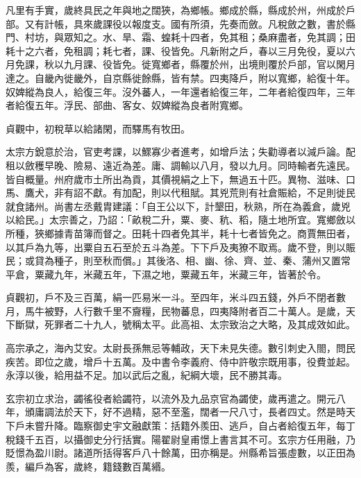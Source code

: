 \begin{pinyinscope}
 凡里有手實，歲終具民之年與地之闊狹，為鄉帳。鄉成於縣，縣成於州，州成於戶部。又有計帳，具來歲課役以報度支。國有所須，先奏而斂。凡稅斂之數，書於縣門、村坊，與眾知之。水、旱、霜、蝗耗十四者，免其租；桑麻盡者，免其調；田耗十之六者，免租調；耗七者，課、役皆免。凡新附之戶，春以三月免役，夏以六月免課，秋以九月課、役皆免。徙寬鄉者，縣覆於州，出境則覆於戶部，官以閑月達之。自畿內徙畿外，自京縣徙餘縣，皆有禁。四夷降戶，附以寬鄉，給復十年。奴婢縱為良人，給復三年。沒外蕃人，一年還者給復三年，二年者給復四年，三年者給復五年。浮民、部曲、客女、奴婢縱為良者附寬鄉。



 貞觀中，初稅草以給諸閑，而驛馬有牧田。



 太宗方銳意於治，官吏考課，以鰥寡少者進考，如增戶法；失勸導者以減戶論。配租以斂穫早晚、險易、遠近為差。庸、調輸以八月，發以九月。同時輸者先遠民。皆自概量。州府歲市土所出為貢，其價視絹之上下，無過五十匹。異物、滋味、口馬、鷹犬，非有詔不獻。有加配，則以代租賦。其兇荒則有社倉賑給，不足則徙民就食諸州。尚書左丞戴胄建議：「自王公以下，計墾田，秋熟，所在為義倉，歲兇以給民。」太宗善之，乃詔：「畝稅二升，粟、麥、秔、稻，隨土地所宜。寬鄉斂以所種，狹鄉據青苗簿而督之。田耗十四者免其半，耗十七者皆免之。商賈無田者，以其戶為九等，出粟自五石至於五斗為差。下下戶及夷獠不取焉。歲不登，則以賑民；或貸為種子，則至秋而償。」其後洛、相、幽、徐、齊、並、秦、蒲州又置常平倉，粟藏九年，米藏五年，下濕之地，粟藏五年，米藏三年，皆著於令。



 貞觀初，戶不及三百萬，絹一匹易米一斗。至四年，米斗四五錢，外戶不閉者數月，馬牛被野，人行數千里不齎糧，民物蕃息，四夷降附者百二十萬人。是歲，天下斷獄，死罪者二十九人，號稱太平。此高祖、太宗致治之大略，及其成效如此。



 高宗承之，海內艾安。太尉長孫無忌等輔政，天下未見失德。數引刺史入閤，問民疾苦。即位之歲，增戶十五萬。及中書令李義府、侍中許敬宗既用事，役費並起。永淳以後，給用益不足。加以武后之亂，紀綱大壞，民不勝其毒。



 玄宗初立求治，蠲徭役者給蠲符，以流外及九品京官為蠲使，歲再遣之。開元八年，頒庸調法於天下，好不過精，惡不至濫，闊者一尺八寸，長者四丈。然是時天下戶未嘗升降。臨察御史宇文融獻策：括籍外羨田、逃戶，自占者給復五年，每丁稅錢千五百，以攝御史分行括實。陽翟尉皇甫憬上書言其不可。玄宗方任用融，乃貶憬為盈川尉。諸道所括得客戶八十餘萬，田亦稱是。州縣希旨張虛數，以正田為羨，編戶為客，歲終，籍錢數百萬緡。




\end{pinyinscope}
